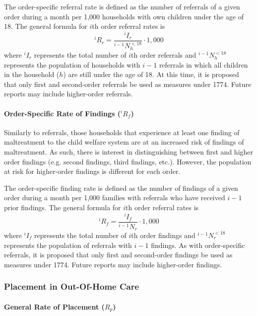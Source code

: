 \documentclass[12pt]{article}\usepackage[]{graphicx}\usepackage[]{color}
\begin{document}
The order-specific referral rate is defined as the number of referrals of a given order during a month per 1,000 households with own children under the age of 18. The general formula for $i$th order referral rates is 
\begin{equation}\label{eq:iRr}
{}^iR_r = \frac{{}^iI_r} {{}^{i-1}N_{h}^{<18}} \cdot 1,000
\end{equation}
where ${}^iI_r$ represents the total number of $i$th order referrals and ${}^{i-1}N_{h}^{<18}$ represents the population of households with $i-1$ referrals in which all children in the household ($h$) are still under the age of 18. At this time, it is proposed that only first and second-order referrals be used as measures under 1774. Future reports may include higher-order referrals. 

\paragraph{Order-Specific Rate of Findings (${}^iR_f$)}

Similarly to referrals, those households that experience at least one finding of maltreatment to the child welfare system are at an increased risk of findings of maltreatment. As such, there is interest in distinguishing between first and higher order findings (e.g. second findings, third findings, etc.). However, the population at risk for higher-order findings is different for each order.

The order-specific finding rate is defined as the number of findings of a given order during a month per 1,000 families with referrals who have received $i-1$ prior findings. The general formula for $i$th order referral rates is 
\begin{equation}\label{eq:iRf}
{}^iR_f = \frac{{}^iI_f} {{}^{i-1}N_{r}} \cdot 1,000
\end{equation}
where ${}^iI_f$ represents the total number of $i$th order findings and ${}^{i-1}N_{r}^{<18}$ represents the population of referrals with $i-1$ findings. As with order-specific referrals, it is proposed that only first and second-order findings be used as measures under 1774. Future reports may include higher-order findings. 

\subsubsection{Placement in Out-Of-Home Care}

\paragraph{General Rate of Placement ($R_p$)}
\end{document}
